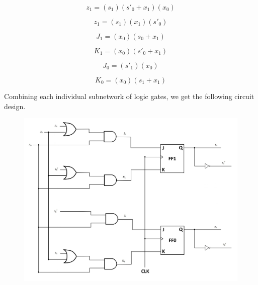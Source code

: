 \documentclass{article}
\begin{document}
\begin{equation*}
z_1 = (s_1)(s'_0 + x_1)(x_0)
\end{equation*}

\begin{equation*}
z_1 = (s_1)(x_1)(s'_0)
\end{equation*}

\begin{equation*}
J_1 = (x_0)(s_0 + x_1)
\end{equation*}

\begin{equation*}
K_1 = (x_0)(s'_0 + x_1)
\end{equation*}

\begin{equation*}
J_0 = (s'_1)(x_0)
\end{equation*}

\begin{equation*}
K_0 = (x_0)(s_1 + x_1)
\end{equation*}

\clearpage

Combining each individual subnetwork of logic gates, we get the following 
circuit design.

\begin{figure}[h!]
\centering
\includegraphics[scale=0.3]{Network}
\end{figure}
\end{document}
